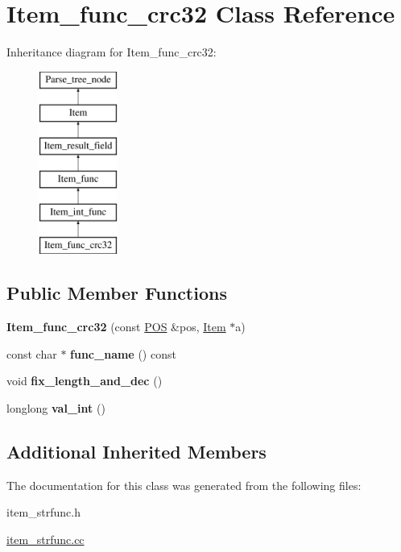\hypertarget{classItem__func__crc32}{}\section{Item\+\_\+func\+\_\+crc32 Class Reference}
\label{classItem__func__crc32}
Inheritance diagram for Item\+\_\+func\+\_\+crc32\+:\begin{figure}[H]
\begin{center}
\leavevmode
\includegraphics[height=6.000000cm]{classItem__func__crc32}
\end{center}
\end{figure}
\subsection*{Public Member Functions}
\begin{DoxyCompactItemize}
\item 
\mbox{\label{classItem__func__crc32_a690cae6e2ef3f3fa52d80b7b93aa807d}} 
{\bfseries Item\+\_\+func\+\_\+crc32} (const \mbox{\hyperlink{structYYLTYPE}{P\+OS}} \&pos, \mbox{\hyperlink{classItem}{Item}} $\ast$a)
\item 
\mbox{\label{classItem__func__crc32_a90cb1f14f9c1ab069541c9dade8f243c}} 
const char $\ast$ {\bfseries func\+\_\+name} () const
\item 
\mbox{\label{classItem__func__crc32_aaacddcb21a12fc8c3946cf21dedbd15c}} 
void {\bfseries fix\+\_\+length\+\_\+and\+\_\+dec} ()
\item 
\mbox{\label{classItem__func__crc32_a3ac8645ffd3c5fabfaf4bf7f5d10eb4f}} 
longlong {\bfseries val\+\_\+int} ()
\end{DoxyCompactItemize}
\subsection*{Additional Inherited Members}


The documentation for this class was generated from the following files\+:\begin{DoxyCompactItemize}
\item 
item\+\_\+strfunc.\+h\item 
\mbox{\hyperlink{item__strfunc_8cc}{item\+\_\+strfunc.\+cc}}\end{DoxyCompactItemize}

